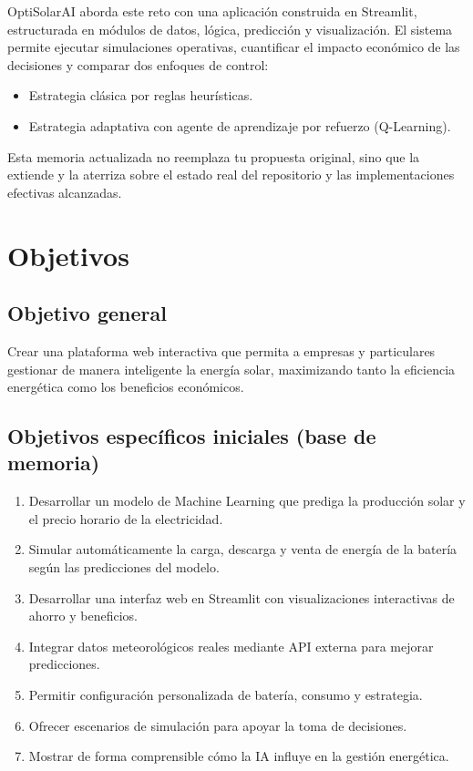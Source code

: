 \documentclass[12pt,a4paper]{article}
\begin{document}
OptiSolarAI aborda este reto con una aplicaci\'on construida en Streamlit, estructurada en m\'odulos de datos, l\'ogica, predicci\'on y visualizaci\'on. El sistema permite ejecutar simulaciones operativas, cuantificar el impacto econ\'omico de las decisiones y comparar dos enfoques de control:
\begin{itemize}
    \item Estrategia cl\'asica por reglas heur\'isticas.
    \item Estrategia adaptativa con agente de aprendizaje por refuerzo (Q-Learning).
\end{itemize}

Esta memoria actualizada no reemplaza tu propuesta original, sino que la extiende y la aterriza sobre el estado real del repositorio y las implementaciones efectivas alcanzadas.

\section{Objetivos}
\subsection{Objetivo general}
Crear una plataforma web interactiva que permita a empresas y particulares gestionar de manera inteligente la energ\'ia solar, maximizando tanto la eficiencia energ\'etica como los beneficios econ\'omicos.

\subsection{Objetivos espec\'ificos iniciales (base de memoria)}
\begin{enumerate}
    \item Desarrollar un modelo de Machine Learning que prediga la producci\'on solar y el precio horario de la electricidad.
    \item Simular autom\'aticamente la carga, descarga y venta de energ\'ia de la bater\'ia seg\'un las predicciones del modelo.
    \item Desarrollar una interfaz web en Streamlit con visualizaciones interactivas de ahorro y beneficios.
    \item Integrar datos meteorol\'ogicos reales mediante API externa para mejorar predicciones.
    \item Permitir configuraci\'on personalizada de bater\'ia, consumo y estrategia.
    \item Ofrecer escenarios de simulaci\'on para apoyar la toma de decisiones.
    \item Mostrar de forma comprensible c\'omo la IA influye en la gesti\'on energ\'etica.
\end{enumerate}
\end{document}
